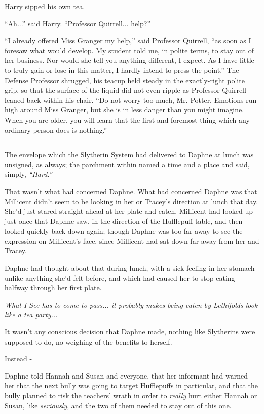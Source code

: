 Harry sipped his own tea.

``Ah...'' said Harry. ``Professor Quirrell... help?''

``I already offered Miss Granger my help,'' said Professor Quirrell,
``as soon as I foresaw what would develop. My student told me, in polite
terms, to stay out of her business. Nor would she tell you anything
different, I expect. As I have little to truly gain or lose in this
matter, I hardly intend to press the point.'' The Defense Professor
shrugged, his teacup held steady in the exactly-right polite grip, so
that the surface of the liquid did not even ripple as Professor Quirrell
leaned back within his chair. ``Do not worry too much, Mr. Potter.
Emotions run high around Miss Granger, but she is in less danger than
you might imagine. When you are older, you will learn that the first and
foremost thing which any ordinary person does is nothing.''

\begin{center}\rule{3in}{0.4pt}\end{center}

The envelope which the Slytherin System had delivered to Daphne at lunch
was unsigned, as always; the parchment within named a time and a place
and said, simply, \emph{``Hard.''}

That wasn't what had concerned Daphne. What had concerned Daphne was
that Millicent didn't seem to be looking in her or Tracey's direction at
lunch that day. She'd just stared straight ahead at her plate and eaten.
Millicent had looked up just once that Daphne saw, in the direction of
the Hufflepuff table, and then looked quickly back down again; though
Daphne was too far away to see the expression on Millicent's face, since
Millicent had sat down far away from her and Tracey.

Daphne had thought about that during lunch, with a sick feeling in her
stomach unlike anything she'd felt before, and which had caused her to
stop eating halfway through her first plate.

\emph{What I See has to come to pass... it probably makes being
eaten by Lethifolds look like a tea party...}

It wasn't any conscious decision that Daphne made, nothing like
Slytherins were supposed to do, no weighing of the benefits to herself.

Instead -

Daphne told Hannah and Susan and everyone, that her informant had warned
her that the next bully was going to target Hufflepuffs in particular,
and that the bully planned to risk the teachers' wrath in order to
\emph{really} hurt either Hannah or Susan, like \emph{seriously}, and
the two of them needed to stay out of this one.

